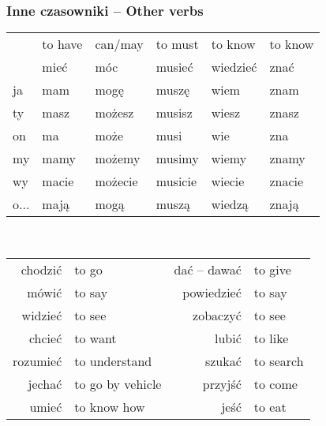 \documentclass[12pt]{refcard}
\begin{document}
\subsubsection{Inne czasowniki -- Other verbs}
\vspace{-1ex}
\begin{tabular}{l@{~~}l@{~~}l@{~~}l@{~~}l@{~~}l}
& \footnotesize to have
& \footnotesize can/may
& \footnotesize to must
& \footnotesize to know
& \footnotesize to know \\
\scriptsize      & mieć    & móc     & musieć  & wiedzieć & znać    \\[.5ex]
\scriptsize ja   & mam     & mogę    & muszę   & wiem     & znam    \\
\scriptsize ty   & masz    & możesz  & musisz  & wiesz    & znasz   \\
\scriptsize on   & ma      & może    & musi    & wie      & zna     \\
\scriptsize my   & mamy    & możemy  & musimy  & wiemy    & znamy   \\
\scriptsize wy   & macie   & możecie & musicie & wiecie   & znacie  \\
\scriptsize o... & mają    & mogą    & muszą   & wiedzą   & znają   \\
\end{tabular} \\[1ex]
\begin{tabular}{r@{ -- }l@{\hspace{-3ex}}r@{ -- }l}
chodzić  & to go            & dać -- dawać  & to give \\
mówić    & to say           & powiedzieć & to say  \\
widzieć  & to see           & zobaczyć   & to see  \\
chcieć   & to  want         & lubić      & to like \\
rozumieć & to understand    & szukać     & to search \\
jechać   & to go by vehicle & przyjść    & to come \\
umieć    & to know how      & jeść       & to eat \\
\end{tabular}

\vspace{-1ex}
\end{document}
